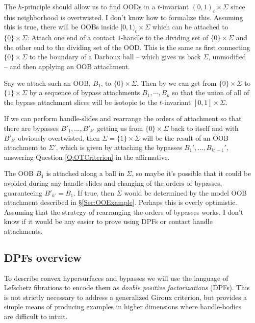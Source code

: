 \documentclass[11pt]{amsart}
\begin{document}
The $h$-principle should allow us to find OODs in a $t$-invariant $(0, 1)_{t} \times \Sigma$ since this neighborhood is overtwisted. I don't know how to formalize this. Assuming this is true, there will be OOBs inside $[0 ,1)_{t} \times \Sigma$ which can be attached to $\{ 0 \} \times \Sigma$: Attach one end of a contact $1$-handle to the dividing set of $\{ 0 \} \times \Sigma$ and the other end to the dividing set of the OOD. This is the same as first connecting $\{0\} \times \Sigma$ to the boundary of a Darboux ball -- which gives us back $\Sigma$, unmodified -- and then applying an OOB attachment.

Say we attach such an OOB, $B_{1}$, to $\{ 0 \} \times \Sigma$. Then by \cite[Theorem 1.2.5]{HH:Convex} we can get from $\{ 0 \} \times \Sigma$ to $\{ 1 \} \times \Sigma$ by a sequence of bypass attachments $B_{1}, \cdots, B_{k}$ so that the union of all of the bypass attachment slices will be isotopic to the $t$-invariant $[0, 1]\times \Sigma$.

If we can perform handle-slides and rearrange the orders of attachment so that there are bypasses $B'_{1}, \dots, B'_{k'}$ getting us from $\{ 0 \} \times \Sigma$ back to itself and with $B'_{k'}$ obviously overtwisted, then $\Sigma = \{ 1 \} \times \Sigma$ will be the result of an OOB attachment to $\Sigma'$, which is given by attaching the bypasses $B_{1}', \dots, B_{k'-1}'$, answering Question \ref{Q:OTCriterion} in the affirmative.

The OOB $B_{1}$ is attached along a ball in $\Sigma$, so maybe it's possible that it could be avoided during any handle-slides and changing of the orders of bypasses, guaranteeing $B'_{k'} = B_{1}$. If true, then $\Sigma$ would be determined by the model OOB attachment described in \S \ref{Sec:OOExample}. Perhaps this is overly optimistic. Assuming that the strategy of rearranging the orders of bypasses works, I don't know if it would be any easier to prove using DPFs or contact handle attachments.

\subsection{DPFs overview}

To describe convex hypersurfaces and bypasses we will use the language of Lefschetz fibrations to encode them as \emph{double positive factorizations} (DPFs). This is not strictly necessary to address a generalized Giroux criterion, but provides a simple means of producing examples in higher dimensions where handle-bodies are difficult to intuit.
\end{document}
